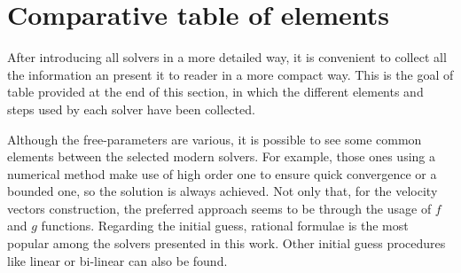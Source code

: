 \section{Comparative table of elements}

After introducing all solvers in a more detailed way, it is convenient to
collect all the information an present it to reader in a more compact way. This
is the goal of table provided at the end of this section, in which the different
elements and steps used by each solver have been collected.

Although the free-parameters are various, it is possible to see some common
elements between the selected modern solvers. For example, those ones using a
numerical method make use of high order one to ensure quick convergence or a
bounded one, so the solution is always achieved. Not only that, for the velocity
vectors construction, the preferred approach seems to be through the usage of
$f$ and $g$ functions. Regarding the initial guess, rational formulae is the
most popular among the solvers presented in this work. Other initial guess
procedures like linear or bi-linear can also be found.


